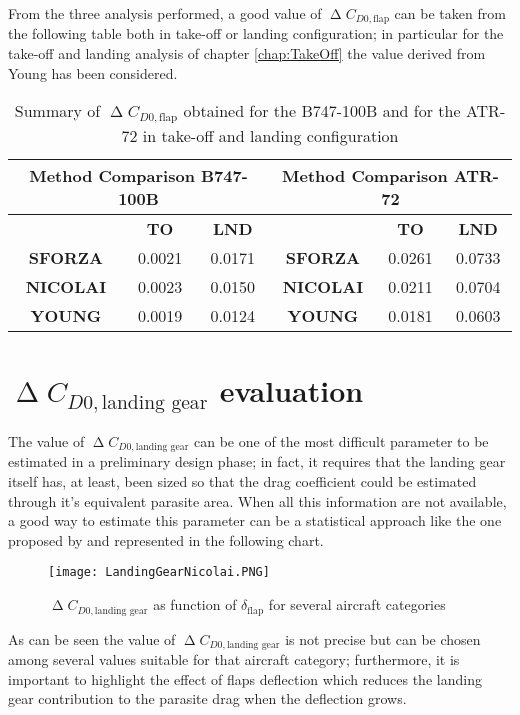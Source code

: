 %
\noindent
From the three analysis performed, a good value of  $\upDelta C_{D0,\text{flap}}$ can be taken from the following table both in take-off or landing configuration; in particular for the take-off and landing analysis of chapter \ref{chap:TakeOff} the value derived from Young\cite{Young:Flaps} has been considered. 
%
\begin{table}[htbp]
  \centering
    \begin{tabular}{ccc||ccc}
    \toprule
    \multicolumn{3}{c}{\textbf{Method Comparison B747-100B}} & \multicolumn{3}{c}{\textbf{Method Comparison ATR-72}} \\
    \midrule
          & \multicolumn{1}{c}{\textbf{TO}} & \multicolumn{1}{c}{\textbf{LND}} &       & \multicolumn{1}{c}{\textbf{TO}} & \multicolumn{1}{c}{\textbf{LND}} \\
          \midrule
    \multicolumn{1}{c}{\textbf{SFORZA}} & 0.0021 & 0.0171 & \multicolumn{1}{c}{\textbf{SFORZA}} & 0.0261 & 0.0733 \\
    \multicolumn{1}{c}{\textbf{NICOLAI}} & 0.0023 & 0.0150 & \multicolumn{1}{c}{\textbf{NICOLAI}} & 0.0211 & 0.0704 \\
    \multicolumn{1}{c}{\textbf{YOUNG}} & 0.0019 & 0.0124 & \multicolumn{1}{c}{\textbf{YOUNG}} & 0.0181 & 0.0603 \\
    \bottomrule
    \end{tabular}
    \caption{Summary of $\upDelta C_{D0,\text{flap}}$ obtained for the B747-100B and for the ATR-72 in take-off and landing configuration}
\end{table}
%
%
\section{$\upDelta C_{D0,\text{landing gear}}$ evaluation}\label{par:DeltaCD0LGComparison}
The value of $\upDelta C_{D0,\text{landing gear}}$ can be one of the most difficult parameter to be estimated in a preliminary design phase; in fact, it requires that the landing gear itself has, at least, been sized so that the drag coefficient could be estimated through it's equivalent parasite area. When all this information are not available, a good way to estimate this parameter can be a statistical approach like the one proposed by \cite{nicolai2010fundamentals} and represented in the following chart.
%
\begin{figure}[H]
\centering
\texttt{[image: LandingGearNicolai.PNG]}
\caption{$\upDelta C_{D0,\text{landing gear}}$ as function of $\delta_{\text{flap}}$ for several aircraft categories}
\end{figure}
%
\noindent
As can be seen the value of $\upDelta C_{D0,\text{landing gear}}$ is not precise but can be chosen among several values suitable for that aircraft category; furthermore, it is important to highlight the effect of flaps deflection which reduces the landing gear contribution to the parasite drag when the deflection grows.
%
%
